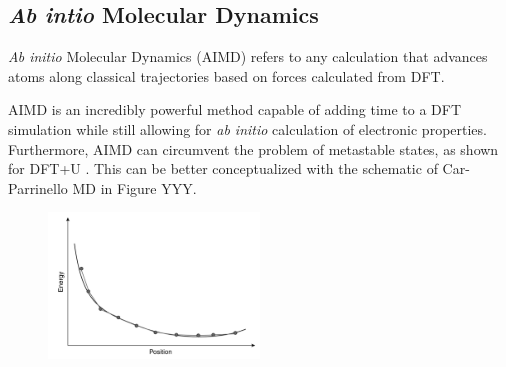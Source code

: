 \documentclass[3p,review,12pt]{elsarticle}
\begin{document}
\subsection{\emph{Ab intio} Molecular Dynamics}
\emph{Ab initio} Molecular Dynamics (AIMD) refers to any calculation that advances atoms along classical trajectories based on forces calculated from DFT\cite{Sholl2009}.
\par 
AIMD is an incredibly powerful method capable of adding time to a DFT simulation while still allowing for \emph{ab initio} calculation of electronic properties. Furthermore, AIMD can circumvent the problem of metastable states, as shown for DFT+U \cite{Zhang2015}. This can be better conceptualized with the schematic of Car-Parrinello MD in Figure YYY.
\begin{figure}[h]
	\includegraphics[width=0.5\textwidth]{practical1}
	\centering
	\caption{} 
\end{figure}
\end{document}
